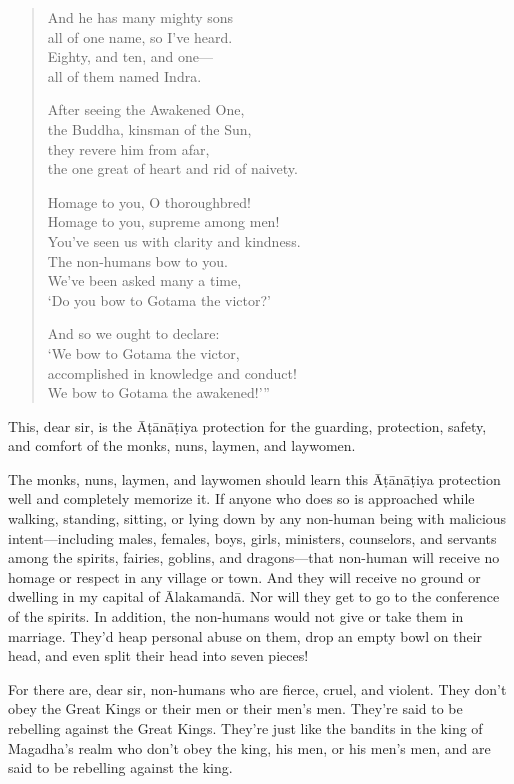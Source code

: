 \documentclass[12pt,openany]{book}%
\begin{document}
\begin{verse}
And he has many mighty sons \\
all of one name, so I’ve heard. \\
Eighty, and ten, and one—\\
all of them named Indra. 

After seeing the Awakened One, \\
the Buddha, kinsman of the Sun, \\
they revere him from afar, \\
the one great of heart and rid of naivety. 

Homage to you, O thoroughbred! \\
Homage to you, supreme among men! \\
You’ve seen us with clarity and kindness. \\
The non-humans bow to you. \\
We’ve been asked many a time, \\
‘Do you bow to Gotama the victor?’ 

And so we ought to declare: \\
‘We bow to Gotama the victor, \\
accomplished in knowledge and conduct! \\
We bow to Gotama the awakened!’” 

%
\end{verse}

This, dear sir, is the \textsanskrit{Āṭānāṭiya} protection for the guarding, protection, safety, and comfort of the monks, nuns, laymen, and laywomen. 

The monks, nuns, laymen, and laywomen should learn this \textsanskrit{Āṭānāṭiya} protection well and completely memorize it. If anyone who does so is approached while walking, standing, sitting, or lying down by any non-human being with malicious intent—including males, females, boys, girls, ministers, counselors, and servants among the spirits, fairies, goblins, and dragons—that non-human will receive no homage or respect in any village or town. And they will receive no ground or dwelling in my capital of \textsanskrit{Ālakamandā}. Nor will they get to go to the conference of the spirits. In addition, the non-humans would not give or take them in marriage. They’d heap personal abuse on them, drop an empty bowl on their head, and even split their head into seven pieces! 

For there are, dear sir, non-humans who are fierce, cruel, and violent. They don’t obey the Great Kings or their men or their men’s men. They’re said to be rebelling against the Great Kings. They’re just like the bandits in the king of Magadha’s realm who don’t obey the king, his men, or his men’s men, and are said to be rebelling against the king. 
\end{document}
